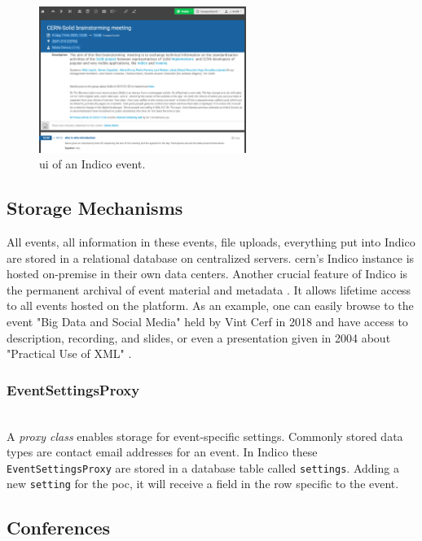\begin{figure}[H]
    \centering
    \includegraphics[width=0.6\textwidth]{thesis/latex/assets/indico-event-interface.png}
    \caption{\gls{ui} of an Indico event.}
    \label{fig:indico-event-interface}
\end{figure} 

\subsection{Storage Mechanisms}

All events, all information in these events, file uploads, everything put into Indico are stored in a relational database on centralized servers. \gls{cern}'s Indico instance is hosted on-premise in their own data centers. Another crucial feature of Indico is the permanent archival of event material and metadata \cite{cern-indico}. It allows lifetime access to all events hosted on the platform. As an example, one can easily browse to the event "Big Data and Social Media" held by Vint Cerf in 2018 \cite{vint-cerf} and have access to description, recording, and slides, or even a presentation given in 2004 about "Practical Use of XML" \cite{titov}.

\subsubsection{EventSettingsProxy}\mbox{}\\

A \textit{proxy class} enables storage for event-specific settings. Commonly stored data types are contact email addresses for an event. In Indico these \texttt{EventSettingsProxy} are stored in a database table called \texttt{settings}. Adding a new \texttt{setting} for the \gls{poc}, it will receive a field in the row specific to the event.

\subsection{Conferences}

